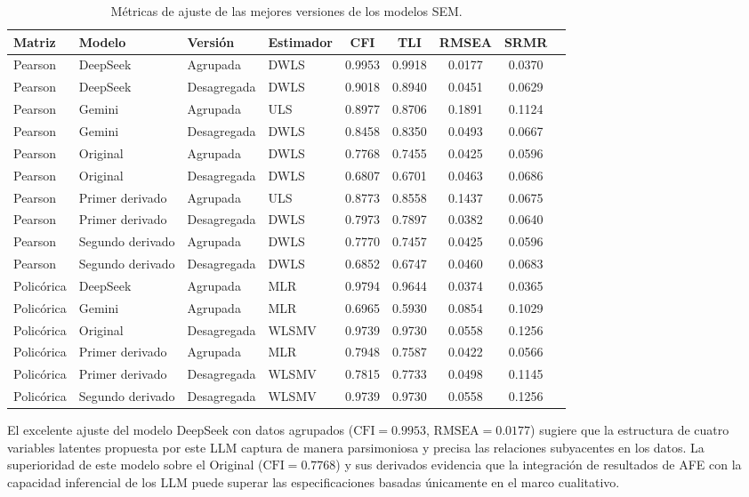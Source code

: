 \documentclass[conference]{IEEEtran}
\begin{document}
\begin{table}[!htb]
\centering
\footnotesize
\begin{tabular}{p{1.5cm}p{2.5cm}p{2.2cm}p{1.5cm}ccccc}
\toprule
\textbf{Matriz} & \textbf{Modelo} & \textbf{Versión} & \textbf{Estimador} & 
\textbf{CFI} & \textbf{TLI} & \textbf{RMSEA} & \textbf{SRMR} \\
\midrule
Pearson & DeepSeek & Agrupada & DWLS & 0.9953 & 0.9918 & 0.0177 & 0.0370 \\
Pearson & DeepSeek & Desagregada & DWLS & 0.9018 & 0.8940 & 0.0451 & 0.0629 \\
Pearson & Gemini & Agrupada & ULS & 0.8977 & 0.8706 & 0.1891 & 0.1124 \\
Pearson & Gemini & Desagregada & DWLS & 0.8458 & 0.8350 & 0.0493 & 0.0667 \\
Pearson & Original & Agrupada & DWLS & 0.7768 & 0.7455 & 0.0425 & 0.0596 \\
Pearson & Original & Desagregada & DWLS & 0.6807 & 0.6701 & 0.0463 & 0.0686 \\
Pearson & Primer derivado & Agrupada & ULS & 0.8773 & 0.8558 & 0.1437 & 0.0675 \\
Pearson & Primer derivado & Desagregada & DWLS & 0.7973 & 0.7897 & 0.0382 & 0.0640 \\
Pearson & Segundo derivado & Agrupada & DWLS & 0.7770 & 0.7457 & 0.0425 & 0.0596 \\
Pearson & Segundo derivado & Desagregada & DWLS & 0.6852 & 0.6747 & 0.0460 & 0.0683 \\
\midrule
Policórica & DeepSeek & Agrupada & MLR & 0.9794 & 0.9644 & 0.0374 & 0.0365 \\
Policórica & Gemini & Agrupada & MLR & 0.6965 & 0.5930 & 0.0854 & 0.1029 \\
Policórica & Original & Desagregada & WLSMV & 0.9739 & 0.9730 & 0.0558 & 0.1256 \\
Policórica & Primer derivado & Agrupada & MLR & 0.7948 & 0.7587 & 0.0422 & 0.0566 \\
Policórica & Primer derivado & Desagregada & WLSMV & 0.7815 & 0.7733 & 0.0498 & 0.1145 \\
Policórica & Segundo derivado & Desagregada & WLSMV & 0.9739 & 0.9730 & 0.0558 & 0.1256 \\
\bottomrule
\end{tabular}
\caption{Métricas de ajuste de las mejores versiones de los modelos SEM.}
\label{tab:indices_ajuste}
\end{table}

El excelente ajuste del modelo DeepSeek con datos agrupados ($\text{CFI} = 0.9953$, $\text{RMSEA} = 0.0177$) sugiere que la estructura de cuatro variables latentes propuesta por este LLM captura de manera parsimoniosa y precisa las relaciones subyacentes en los datos. La superioridad de este modelo sobre el Original ($\text{CFI} = 0.7768$) y sus derivados evidencia que la integración de resultados de AFE con la capacidad inferencial de los LLM puede superar las especificaciones basadas únicamente en el marco cualitativo.
\end{document}

